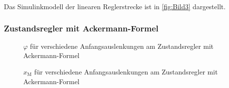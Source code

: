 \documentclass[
	pagesize,
	fontsize=12pt,
	paper=a4,
	oneside,
   reqno
]{scrartcl}
\begin{document}
Das Simulinkmodell der linearen Reglerstrecke ist in \autoref{fig:Bild3} dargestellt.

\subsubsection{Zustandsregler mit Ackermann-Formel}

\begin{figure}[H]
    \centering
    \caption[$\varphi$ für Regler mit Ackermann-Formel]{$\varphi$ für verschiedene Anfangsauslenkungen am Zustandsregler mit Ackermann-Formel}
    \label{fig:Bild12}
\end{figure}

\begin{figure}[H]
    \centering
    \caption[$x_{\mathrm{M}}$ für Regler mit Ackermann-Formel]{$x_{\mathrm{M}}$ für verschiedene Anfangsauslenkungen am Zustandsregler mit Ackermann-Formel}
    \label{fig:Bild13}
\end{figure}
\end{document}
